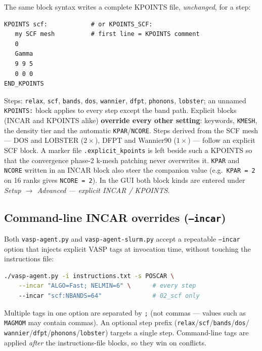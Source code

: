 \documentclass[11pt,a4paper]{scrartcl}
\begin{document}
The same block syntax writes a complete KPOINTS file, \emph{unchanged}, for
a step:

\begin{lstlisting}
KPOINTS scf:            # or KPOINTS_SCF:
   my SCF mesh          # first line = KPOINTS comment
   0
   Gamma
   9 9 5
   0 0 0
END_KPOINTS
\end{lstlisting}

Steps: \texttt{relax}, \texttt{scf}, \texttt{bands}, \texttt{dos},
\texttt{wannier}, \texttt{dfpt}, \texttt{phonons}, \texttt{lobster}; an
unnamed \texttt{KPOINTS:} block applies to every step except the band path.
Explicit blocks (INCAR and KPOINTS alike) \textbf{override every other
setting}: keywords, \texttt{KMESH}, the density tier and the automatic
\texttt{KPAR}/\texttt{NCORE}.  Steps derived from the SCF mesh --- DOS and
LOBSTER ($2\times$), DFPT and Wannier90 ($1\times$) --- follow an explicit
SCF block.  A marker file \texttt{.explicit\_kpoints} is left beside such a
KPOINTS so that the convergence phase-2 k-mesh patching never overwrites
it.  \texttt{KPAR} and \texttt{NCORE} written in an INCAR block also steer the
companion value (e.g.\ \texttt{KPAR = 2} on 16 ranks gives \texttt{NCORE = 2}).
In the GUI both block kinds are entered under
\emph{Setup $\to$ Advanced --- explicit INCAR / KPOINTS}.

\subsection{Command-line INCAR overrides (\texttt{--incar})}
\label{sec:incar-cli}

Both \texttt{vasp-agent.py} and \texttt{vasp-agent-slurm.py} accept a
repeatable \texttt{--incar} option that injects explicit VASP tags at
invocation time, without touching the instructions file:

\begin{lstlisting}[language=bash]
./vasp-agent.py -i instructions.txt -s POSCAR \
    --incar "ALGO=Fast; NELMIN=6" \      # every step
    --incar "scf:NBANDS=64"              # 02_scf only
\end{lstlisting}

Multiple tags in one option are separated by \texttt{;} (not commas ---
values such as \texttt{MAGMOM} may contain commas).  An optional step
prefix (\texttt{relax}/\texttt{scf}/\texttt{bands}/\texttt{dos}/%
\texttt{wannier}/\texttt{dfpt}/\texttt{phonons}/\texttt{lobster})
targets a single step.  Command-line tags are applied \emph{after} the
instructions-file blocks, so they win on conflicts.
\end{document}
